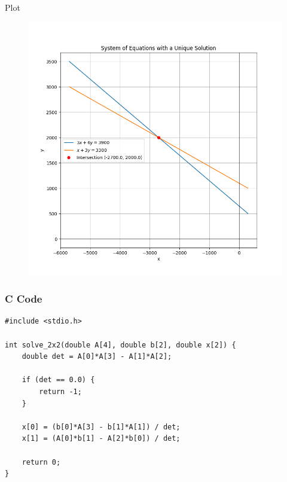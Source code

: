\documentclass{beamer}
\begin{document}
\begin{frame}{Plot}
\begin{figure}[h!]
    \centering
    \includegraphics[height=0.5\textheight, keepaspectratio]{figs/Figure_1.png}
    \label{figure_1}
\end{figure}
\end{frame}

\begin{frame}[fragile]
    \frametitle{C Code}
    \begin{lstlisting}
#include <stdio.h>

int solve_2x2(double A[4], double b[2], double x[2]) {
    double det = A[0]*A[3] - A[1]*A[2]; 

    if (det == 0.0) {
        return -1; 
    }

    x[0] = (b[0]*A[3] - b[1]*A[1]) / det;
    x[1] = (A[0]*b[1] - A[2]*b[0]) / det;

    return 0; 
}


    \end{lstlisting}
\end{frame}
\end{document}
